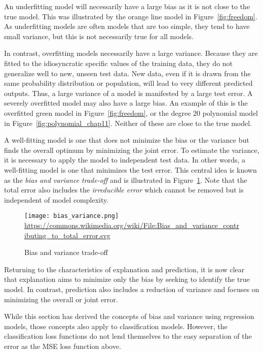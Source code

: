 An underfitting model will necessarily have a large bias as it is not close to the true model. This was illustrated by the orange line model in Figure~\ref{fig:freedom}. As underfitting models are often models that are too simple, they tend to have small variance, but this is not necessarily true for all models. 

In contrast, overfitting models necessarily have a large variance. Because they are fitted to the idiosyncratic specific values of the training data, they do not generalize well to new, unseen test data. New data, even if it is drawn from the same probability distribution or population, will lead to very different predicted outputs. Thus, a large variance of a model is manifested by a large test error. A severely overfitted model may also have a large bias. An example of this is the overfitted green model in Figure~\ref{fig:freedom}, or the degree 20 polynomial model in Figure~\ref{fig:polynomial_chap11}. Neither of these are close to the true model. 

A well-fitting model is one that does not minimize the bias or the variance but finds the overall optimum by minimizing the joint error. To estimate the variance, it is necessary to apply the model to independent test data. In other words, a well-fitting model is one that minimizes the test error. This central idea is known as the \emph{bias and variance trade-off} and is illustrated in Figure~\ref{fig:biasvariancetradeoff}. Note that the total error also includes the \emph{irreducible error} which cannot be removed but is independent of model complexity.

\begin{figure}
\centering
\centering
\texttt{[image: bias\_variance.png]}\\

\scriptsize \url{https://commons.wikimedia.org/wiki/File:Bias_and_variance_contributing_to_total_error.svg}
\caption{Bias and variance trade-off}
\label{fig:biasvariancetradeoff}
\end{figure}

Returning to the characteristics of explanation and prediction, it is now clear that explanation aims to minimize only the bias by seeking to identify the true model. In contrast, prediction also includes a reduction of variance and focuses on minimizing the overall or joint error.

While this section has derived the concepts of bias and variance using regression models, those concepts also apply to classification models. However, the classification loss functions do not lend themselves to the easy separation of the error as the MSE loss function above.


